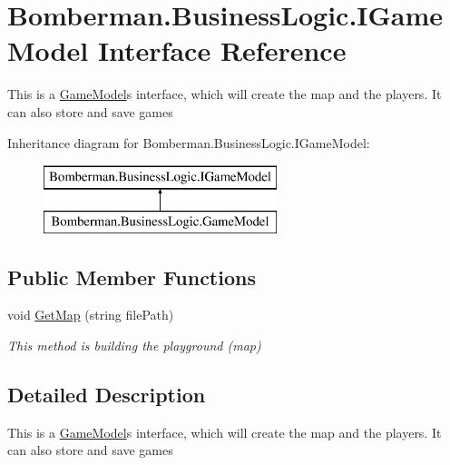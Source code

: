 \hypertarget{interface_bomberman_1_1_business_logic_1_1_i_game_model}{}\section{Bomberman.\+Business\+Logic.\+I\+Game\+Model Interface Reference}
\label{interface_bomberman_1_1_business_logic_1_1_i_game_model}


This is a \mbox{\hyperlink{class_bomberman_1_1_business_logic_1_1_game_model}{Game\+Model}}\textquotesingle{}s interface, which will create the map and the players. It can also store and save games  


Inheritance diagram for Bomberman.\+Business\+Logic.\+I\+Game\+Model\+:\begin{figure}[H]
\begin{center}
\leavevmode
\includegraphics[height=2.000000cm]{interface_bomberman_1_1_business_logic_1_1_i_game_model}
\end{center}
\end{figure}
\subsection*{Public Member Functions}
\begin{DoxyCompactItemize}
\item 
void \mbox{\hyperlink{interface_bomberman_1_1_business_logic_1_1_i_game_model_ad00b9948871adc4b67dc0ef4ed6960ab}{Get\+Map}} (string file\+Path)
\begin{DoxyCompactList}\small\item\em This method is building the playground (map) \end{DoxyCompactList}\end{DoxyCompactItemize}


\subsection{Detailed Description}
This is a \mbox{\hyperlink{class_bomberman_1_1_business_logic_1_1_game_model}{Game\+Model}}\textquotesingle{}s interface, which will create the map and the players. It can also store and save games 



